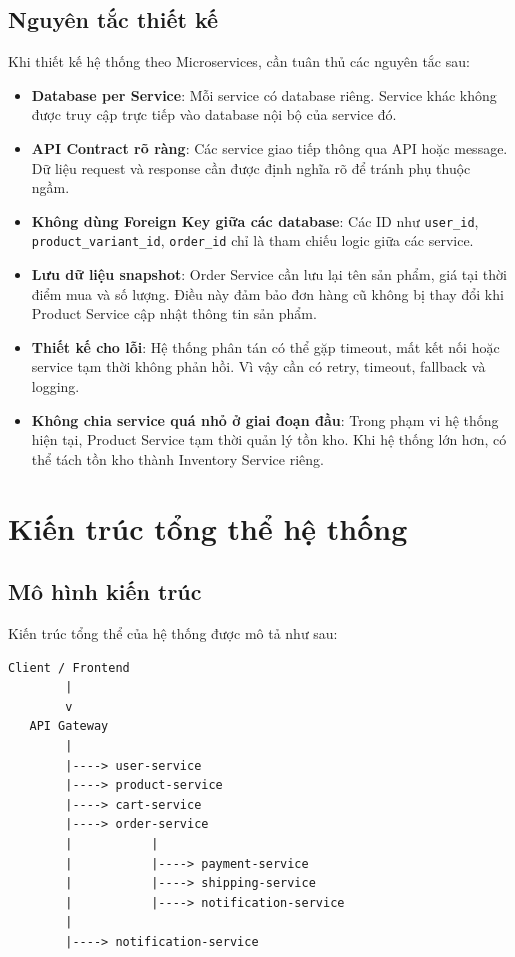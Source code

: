 \subsection{Nguyên tắc thiết kế}

Khi thiết kế hệ thống theo Microservices, cần tuân thủ các nguyên tắc sau:

\begin{itemize}
  \item \textbf{Database per Service}: Mỗi service có database riêng. Service khác không được truy cập trực tiếp vào database nội bộ của service đó.

  \item \textbf{API Contract rõ ràng}: Các service giao tiếp thông qua API hoặc message. Dữ liệu request và response cần được định nghĩa rõ để tránh phụ thuộc ngầm.

  \item \textbf{Không dùng Foreign Key giữa các database}: Các ID như \texttt{user\_id}, \texttt{product\_variant\_id}, \texttt{order\_id} chỉ là tham chiếu logic giữa các service.

  \item \textbf{Lưu dữ liệu snapshot}: Order Service cần lưu lại tên sản phẩm, giá tại thời điểm mua và số lượng. Điều này đảm bảo đơn hàng cũ không bị thay đổi khi Product Service cập nhật thông tin sản phẩm.

  \item \textbf{Thiết kế cho lỗi}: Hệ thống phân tán có thể gặp timeout, mất kết nối hoặc service tạm thời không phản hồi. Vì vậy cần có retry, timeout, fallback và logging.

  \item \textbf{Không chia service quá nhỏ ở giai đoạn đầu}: Trong phạm vi hệ thống hiện tại, Product Service tạm thời quản lý tồn kho. Khi hệ thống lớn hơn, có thể tách tồn kho thành Inventory Service riêng.
\end{itemize}

\section{Kiến trúc tổng thể hệ thống}

\subsection{Mô hình kiến trúc}

Kiến trúc tổng thể của hệ thống được mô tả như sau:

\begin{verbatim}
Client / Frontend
        |
        v
   API Gateway
        |
        |----> user-service
        |----> product-service
        |----> cart-service
        |----> order-service
        |           |
        |           |----> payment-service
        |           |----> shipping-service
        |           |----> notification-service
        |
        |----> notification-service
\end{verbatim}

